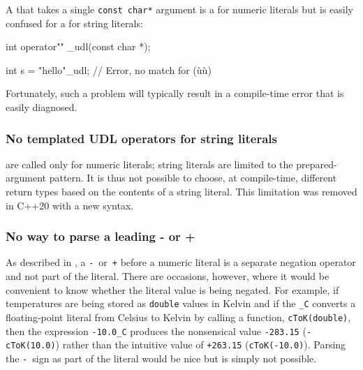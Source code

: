 A  that takes a single
\lstinline!const!~\lstinline!char*! argument is a 
for numeric literals but is easily confused for a
 for string literals:

\begin{emcppslisting}
int operator"" _udl(const char *);

int s = "hello"_udl;  // Error, no match for (ù{}ù)
\end{emcppslisting}
    
\noindent Fortunately, such a problem will typically result in a compile-time
error that is easily \mbox{diagnosed}.

\subsubsection[No templated UDL operators for string literals]{No templated UDL operators for string literals}\label{no-templated-udl-operators-for-string-literals}

 are called only for numeric literals;
string literals are limited to the prepared-argument pattern. It is thus
not possible to choose, at compile-time, different return types based on
the contents of a string literal. This limitation was removed in
C++20 with a new syntax.

\subsubsection[No way to parse a leading \lstinline!-! or \lstinline!+!]{No way to parse a leading {\SubsubsecCode -} or {\SubsubsecCode +}}\label{no-way-to-parse-a-leading---or-+}

As described in , a
\lstinline!-!~or~\lstinline!+! before a numeric literal is a separate negation
operator and not part of the literal. There are occasions, however,
where it would be convenient to know whether the literal value is being
negated. For example, if temperatures are being stored as
\lstinline!double! values in Kelvin and if the 
\lstinline!_C! converts a floating-point literal from Celsius to Kelvin by
calling a function, \lstinline!cToK(double)!, then the expression
\lstinline!-10.0_C! produces the nonsensical value \lstinline!-283.15!
(\lstinline!-cToK(10.0)!) rather than the intuitive value of \lstinline!+263.15!
(\lstinline!cToK(-10.0)!). Parsing the
\lstinline!-!~sign as part of the literal would be nice but is simply not possible.

